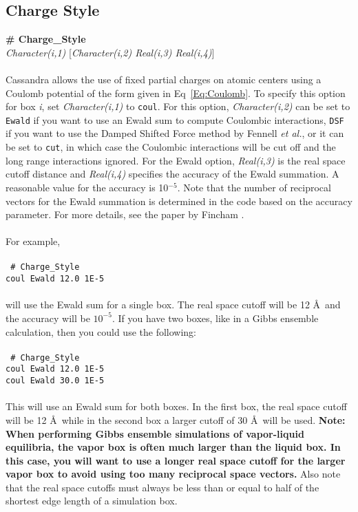 \subsection{Charge Style}\label{sec:Charge_Style}
{\bf \# Charge\_Style} \\
{\it Character(i,1)} [{\it Character(i,2) Real(i,3) Real(i,4)}] \\ \\
%
Cassandra allows the use of fixed partial charges on atomic centers
using a Coulomb potential of the form given in Eq~\ref{Eq:Coulomb}. To
specify this option for box {\em i}, set {\it Character(i,1)} to
\texttt{coul}. For this option,
{\it Character(i,2)} can be set to \texttt{Ewald} if you want to use
an Ewald sum to compute Coulombic interactions, \texttt{DSF} if you want to use
the Damped Shifted Force method by Fennell \textit{et al.}\cite{Fennell:2006}, or it can be set to
\texttt{cut}, in which case the Coulombic interactions will be cut off and
the long range interactions ignored. For the Ewald option, 
{\it Real(i,3)} is the real space cutoff distance and {\it Real(i,4)}
specifies the accuracy of the Ewald summation. A reasonable value for
the accuracy is 10$^{-5}$. Note that the number of reciprocal vectors
for the Ewald summation is determined in the code based on the
accuracy parameter. For more details, see the paper by Fincham
\cite{Fincham:1994}.\\ \\ 
%
For example,
\\ \\
\texttt{
\# Charge\_Style \\
coul Ewald 12.0 1E-5}\\ \\
will use the Ewald sum for a single box. The real space cutoff will be
12 \AA\ and the accuracy will be $10^{-5}$. If you have two boxes,
like in a Gibbs ensemble calculation, then you could use the
following:
\\ \\
\texttt{
\# Charge\_Style \\
coul Ewald 12.0 1E-5\\
coul Ewald 30.0 1E-5}
\\ \\ 
This will use an Ewald sum for both boxes. In the first box, the real
space cutoff will be 12 \AA\ while in the second box a larger cutoff
of 30 \AA\ will be used. {\bf Note: When performing Gibbs ensemble
  simulations of vapor-liquid equilibria, the vapor box is often much
  larger than the liquid box. In this case, you will want to use a
  longer real space cutoff for the larger vapor box to avoid using too
  many reciprocal space vectors.} Also note that the real space
cutoffs must always be less than or equal to half of the shortest edge
length of a simulation box. \\ 

